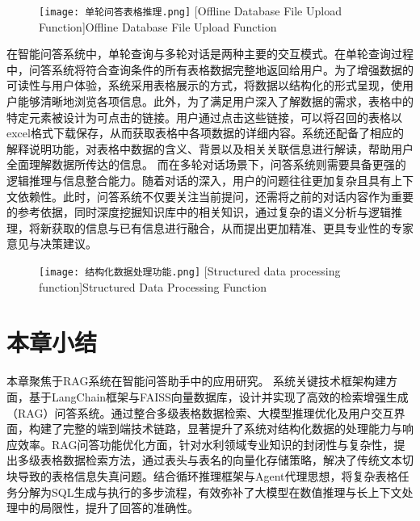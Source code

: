 \begin{figure}[htb]
    \centering
    \texttt{[image: 单轮问答表格推理.png]}
    [Offline Database File Upload Function]{Offline Database File Upload Function}
    \label{fig:单轮问答}
\end{figure}
在智能问答系统中，单轮查询与多轮对话是两种主要的交互模式。在单轮查询过程中，问答系统将符合查询条件的所有表格数据完整地返回给用户。为了增强数据的可读性与用户体验，系统采用表格展示的方式，将数据以结构化的形式呈现，使用户能够清晰地浏览各项信息。此外，为了满足用户深入了解数据的需求，表格中的特定元素被设计为可点击的链接。用户通过点击这些链接，可以将召回的表格以excel格式下载保存，从而获取表格中各项数据的详细内容。系统还配备了相应的解释说明功能，对表格中数据的含义、背景以及相关关联信息进行解读，帮助用户全面理解数据所传达的信息。
而在多轮对话场景下，问答系统则需要具备更强的逻辑推理与信息整合能力。随着对话的深入，用户的问题往往更加复杂且具有上下文依赖性。此时，问答系统不仅要关注当前提问，还需将之前的对话内容作为重要的参考依据，同时深度挖掘知识库中的相关知识，通过复杂的语义分析与逻辑推理，将新获取的信息与已有信息进行融合，从而提出更加精准、更具专业性的专家意见与决策建议。
\begin{figure}[ht]
    \centering
    \texttt{[image: 结构化数据处理功能.png]}
    [Structured data processing function]{Structured Data Processing Function}
    \label{fig:结构化数据}
\end{figure}


\section{本章小结}
本章聚焦于RAG系统在智能问答助手中的应用研究。
系统关键技术框架构建方面，基于LangChain框架与FAISS向量数据库，设计并实现了高效的检索增强生成（RAG）问答系统。通过整合多级表格数据检索、大模型推理优化及用户交互界面，构建了完整的端到端技术链路，显著提升了系统对结构化数据的处理能力与响应效率。RAG问答功能优化方面，针对水利领域专业知识的封闭性与复杂性，提出多级表格数据检索方法，通过表头与表名的向量化存储策略，解决了传统文本切块导致的表格信息失真问题。结合循环推理框架与Agent代理思想，将复杂表格任务分解为SQL生成与执行的多步流程，有效弥补了大模型在数值推理与长上下文处理中的局限性，提升了回答的准确性。

